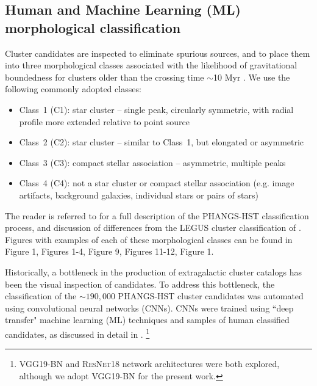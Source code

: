 \documentclass[linenumbers]{aastex63}
\begin{document}
\subsection{Human and Machine Learning (ML) morphological classification}\label{ssec:classification}
Cluster candidates are inspected to eliminate spurious sources, and to place them into three morphological classes associated
with the likelihood of gravitational boundedness for clusters older than the crossing time $\sim$10 Myr \citep{whitmore_antennae_2010, gieles_distinction_2011, bastian_stellar_2012, fall_similarities_2012, chandar_star-cluster_2014, grasha_spatial_2015, adamo_legacy_2017, krumholz_star_2019, cook_star_2019, wei_deep_2020}.  We use the following commonly adopted classes:
\begin{itemize}
    \item Class~1 (C1): star cluster -- single peak, circularly symmetric, with radial profile more extended relative to point source
    \item Class~2 (C2): star cluster -- similar to Class~1, but elongated or asymmetric 
    \item Class~3 (C3): compact stellar association -- asymmetric, multiple peaks %
    \item Class~4 (C4): not a star cluster or compact stellar association (e.g. image artifacts, background galaxies, individual stars or pairs of stars) 
\end{itemize}
The reader is referred to \citet{whitmore_star_2021} for a full description of the PHANGS-HST classification process, and discussion of differences from the LEGUS cluster classification of \citet{adamo_legacy_2017}.  Figures with examples of each of these morphological classes can be found in \citet{wei_deep_2020} Figure 1, \citet{whitmore_star_2021} Figures 1-4, \citet{lee_phangs-hst_2022} Figure 9, \citet{deger_bright_2022} Figures 11-12, \citet{hannon_star_2023} Figure 1.

Historically, a bottleneck in the production of extragalactic cluster catalogs has been the visual inspection of candidates.
To address this bottleneck, the classification of the $\sim190,000$ PHANGS-HST cluster candidates was automated using convolutional neural networks (CNNs).  CNNs were trained using ``deep transfer" machine learning (ML) techniques and samples of human classified candidates, as discussed in detail in \cite{wei_deep_2020, whitmore_star_2021, hannon_star_2023}. \footnote{\textsc{VGG19-BN} \citep{simonyan_very_2015} and \textsc{ResNet18} \citep{he_deep_2015} network architectures were both explored, although we adopt \textsc{VGG19-BN} for the present work.}
\end{document}
